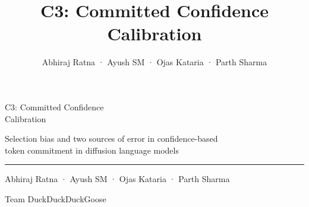\documentclass[aspectratio=169,10pt,t]{beamer}
\title{C3: Committed Confidence Calibration}
\author{Abhiraj Ratna · Ayush SM · Ojas Kataria · Parth Sharma}
\begin{document}
\begin{frame}[c,plain]
  \hspace*{4mm}\begin{minipage}{0.9\linewidth}\raggedright
    {\fontsize{24}{28}\selectfont\firasemibold C3: Committed Confidence\\[1mm] Calibration}\par
    \vspace{3mm}
    {\color{ink2}\large Selection bias and two sources of error in confidence-based\\[0.6mm]
      token commitment in diffusion language models}\par
    \vspace{5mm}
    {\color{accent}\rule{14mm}{1.6pt}}\par
    \vspace{5mm}
    {\normalsize Abhiraj Ratna · Ayush SM · Ojas Kataria · Parth Sharma}\par
    \vspace{1.2mm}
    {\small\color{ink2}Team DuckDuckDuckGoose}
  \end{minipage}
\end{frame}
\end{document}

